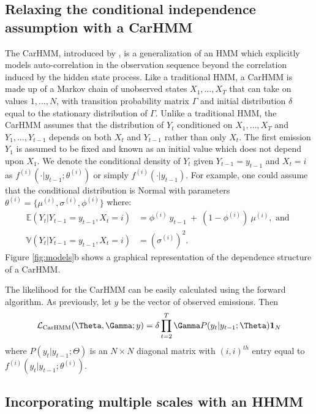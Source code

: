\subsection{Relaxing the conditional independence assumption with a CarHMM}

The CarHMM, introduced by \citet{Lawler:2019}, is a generalization of an HMM which explicitly models auto-correlation in the observation sequence beyond the correlation induced by the hidden state process. Like a traditional HMM, a CarHMM is made up of a Markov chain of unobserved states $X_1,\ldots, X_T$ that can take on values $1, \ldots, N$, with transition probability matrix $\Gamma$ and initial distribution $\delta$ equal to the stationary distribution of $\Gamma$. Unlike a traditional HMM, the CarHMM assumes that the distribution of $Y_t$ conditioned on $X_1,\ldots, X_T$ and $Y_1,\ldots, Y_{t-1}$ depends on both $X_t$ and $Y_{t-1}$ rather than only $X_t$. 
The first emission $Y_1$ is assumed to be fixed and known as an initial value which does not depend upon $X_1$.
%
We denote the conditional density of $Y_t$ given $Y_{t-1} = y_{t-1}$ and $X_t=i$ as $f^{(i)}( \cdot | y_{t-1}; \theta^{(i)})$ or simply $f^{(i)}( \cdot | y_{t-1})$.
For example, one could assume that the conditional distribution is Normal with parameters $\theta^{(i)} = \{\mu^{(i)},\sigma^{(i)},\phi^{(i)}\}$ where:
%
\begin{align*}
\mathbb{E}(Y_t|Y_{t-1} = y_{t-1},X_t=i) &= \phi^{(i)} ~ y_{t-1} ~+ ~(1-\phi^{(i)})  ~\mu^{(i)}, \text{ and } \\
\mathbb{V}(Y_t| Y_{t-1} = y_{t-1}, X_t = i) &= (\sigma^{(i)})^2.
\end{align*}
%
Figure \ref{fig:models}b shows a graphical representation of the dependence structure of a CarHMM.

The likelihood for the CarHMM can be easily calculated using the forward algorithm. As previously, let $y$ be the vector of observed emissions. Then
\begin{equation*}
    \calL_{\text{CarHMM}}(\Theta,\Gamma;y) = \delta \prod_{t=2}^T \Gamma P(y_t|y_{t-1};\Theta) \mathbf{1}_N
    \label{CarHMM_likelihood}
\end{equation*}
where
%
$P(y_t|y_{t-1};\Theta)$ is an $N \times N$ diagonal matrix with $(i,i)^{th}$ entry equal to $f^{(i)}(y_t|y_{t-1}; \theta^{(i)})$.

\subsection{Incorporating multiple scales with an HHMM}

